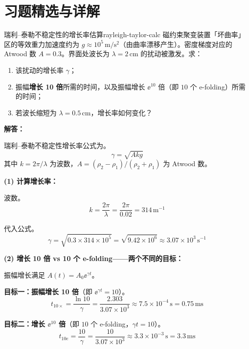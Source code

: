 
\section*{习题精选与详解}
{}

\begin{example}{瑞利--泰勒不稳定性的增长率估算}{rayleigh-taylor-calc}
磁约束聚变装置「坏曲率」区的等效重力加速度约为 $g \approx 10^{5}\,\mathrm{m/s^2}$（由曲率漂移产生）。密度梯度对应的 Atwood 数 $A = 0.3$。界面处波长为 $\lambda = 2\,\mathrm{cm}$ 的扰动被激发。求：
\begin{enumerate}[label=(\arabic*)]
\item 该扰动的增长率 $\gamma$；
\item 振幅\textbf{增长 10 倍}所需的时间，以及振幅增长 $\ee^{10}$ 倍（即 $10$ 个 e-folding）所需的时间；
\item 若波长缩短为 $\lambda = 0.5\,\mathrm{cm}$，增长率如何变化？
\end{enumerate}
\tcblower
\textbf{解答：}

瑞利--泰勒不稳定性增长率公式为。
\[
\gamma = \sqrt{A k g}
\]
其中 $k = 2\pi/\lambda$ 为波数，$A = (\rho_2 - \rho_1)/(\rho_2 + \rho_1)$ 为 Atwood 数。

\textbf{(1) 计算增长率：}

波数。
\[
k = \frac{2\pi}{\lambda} = \frac{2\pi}{0.02} = 314\,\mathrm{m}^{-1}
\]

代入公式。
\[
\gamma = \sqrt{0.3\times 314\times 10^{5}} = \sqrt{9.42\times 10^{6}}
\approx 3.07\times 10^{3}\,\mathrm{s}^{-1}
\]

\textbf{(2) 增长 10 倍 vs 10 个 e-folding——两个不同的目标：}

振幅增长满足 $A(t) = A_0\ee^{\gamma t}$。

\textbf{目标一：振幅增长 10 倍}（即 $\ee^{\gamma t}=10$）。
\[
t_{10\times} = \frac{\ln 10}{\gamma} = \frac{2.303}{3.07\times 10^{3}} \approx 7.5\times 10^{-4}\,\mathrm{s} = 0.75\,\mathrm{ms}
\]

\textbf{目标二：增长 $\ee^{10}$ 倍}（即 $10$ 个 e-folding，$\gamma t=10$）。
\[
t_{10e} = \frac{10}{\gamma} = \frac{10}{3.07\times 10^{3}} \approx 3.3\times 10^{-3}\,\mathrm{s} = 3.3\,\mathrm{ms}
\]


\end{example}
